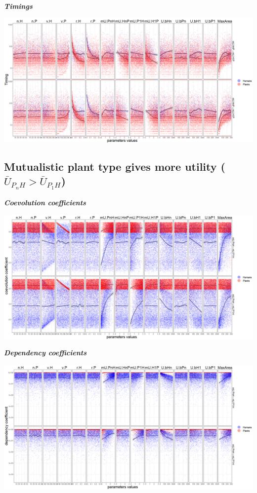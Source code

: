 \documentclass[]{book}
\begin{document}
\textbf{\emph{Timings}}

\includegraphics[width=1\linewidth]{plots/5_multiplePar-timing-humanImprove-ggplot}

\newpage

\hypertarget{mutualistic-plant-type-gives-more-utility-baru_p_nh-baru_p_1h}{%
\subsection{\texorpdfstring{Mutualistic plant type gives more utility (\(\bar{U}_{P_{n}H}> \bar{U}_{P_{1}H}\))}{Mutualistic plant type gives more utility (\textbackslash{}bar\{U\}\_\{P\_\{n\}H\}\textgreater{} \textbackslash{}bar\{U\}\_\{P\_\{1\}H\})}}\label{mutualistic-plant-type-gives-more-utility-baru_p_nh-baru_p_1h}}


\textbf{\emph{Coevolution coefficients}}

\includegraphics[width=1\linewidth]{plots/5_multiplePar-coevo-plantImprove-ggplot}

\textbf{\emph{Dependency coefficients}}

\includegraphics[width=1\linewidth]{plots/5_multiplePar-depend-plantImprove-ggplot}
\end{document}
